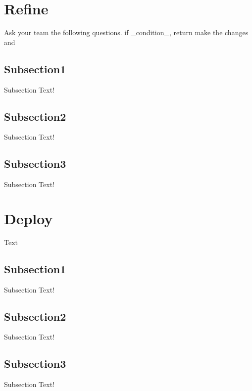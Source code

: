 \documentclass[12pt,journal,compsoc]{IEEEtran}
\begin{document}
\section{Refine} Ask your team the following questions. if \_condition\_, return make the changes and
    \subsection{Subsection1}Subsection Text!
    \subsection{Subsection2}Subsection Text!
    \subsection{Subsection3}Subsection Text!
\section{Deploy} Text
    \subsection{Subsection1}Subsection Text!
    \subsection{Subsection2}Subsection Text!
    \subsection{Subsection3}Subsection Text!

		
\end{document}
